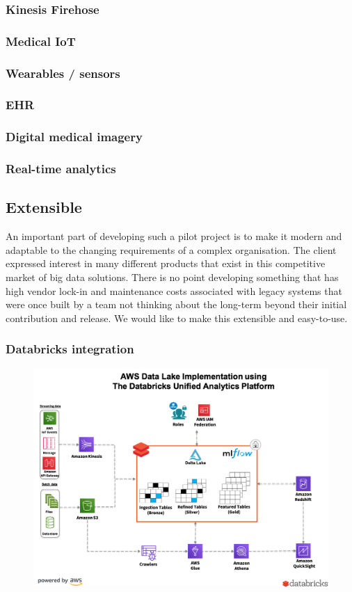 \documentclass[10pt]{article}
\begin{document}
\subsubsection{Kinesis Firehose}
\subsubsection{Medical IoT}
\subsubsection{Wearables / sensors}
\subsubsection{EHR}
\subsubsection{Digital medical imagery}
\subsubsection{Real-time analytics}
\fi

\subsection{Extensible}
An important part of developing such a pilot project is to make it modern and adaptable to the changing requirements of a complex organisation. The client expressed interest in many different products that exist in this competitive market of big data solutions. There is no point developing something that has high vendor lock-in and maintenance costs associated with legacy systems that were once built by a team not thinking about the long-term beyond their initial contribution and release. We would like to make this extensible and easy-to-use.
\subsubsection{Databricks integration}
\begin{figure}[h!]
	\centering
	\includegraphics[width=1\linewidth]{images/AWS-Data-Lake-Architecture-light-BG.png}
\end{figure}
\end{document}

